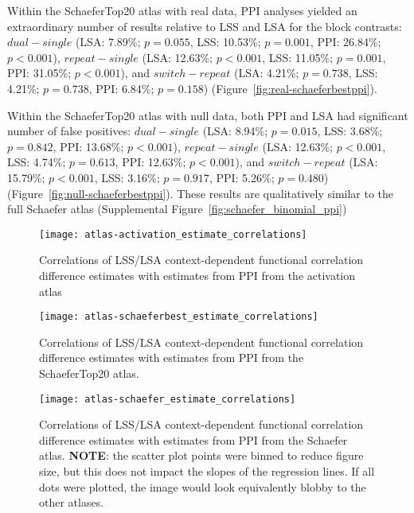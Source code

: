 \documentclass[phd,appendix,figures]{uithesis}
\begin{document}
Within the SchaeferTop20 atlas with real data, PPI analyses yielded an extraordinary number of results
relative to LSS and LSA for the block contrasts:
$dual - single$ (LSA: 7.89\%; $p = 0.055$, LSS: 10.53\%; $p = 0.001$, PPI: 26.84\%; $p < 0.001$),
$repeat - single$ (LSA: 12.63\%; $p < 0.001$, LSS: 11.05\%; $p = 0.001$, PPI: 31.05\%; $p < 0.001$), and
$switch - repeat$ (LSA: 4.21\%; $p = 0.738$, LSS: 4.21\%; $p = 0.738$, PPI: 6.84\%; $p = 0.158$) (Figure~\ref{fig:real-schaeferbestppi}).

Within the SchaeferTop20 atlas with null data, both PPI and LSA had significant number of false positives:
$dual - single$ (LSA: 8.94\%; $p = 0.015$, LSS: 3.68\%; $p = 0.842$, PPI: 13.68\%; $p < 0.001$),
$repeat - single$ (LSA: 12.63\%; $p < 0.001$, LSS: 4.74\%; $p = 0.613$, PPI: 12.63\%; $p < 0.001$), and
$switch - repeat$ (LSA: 15.79\%; $p < 0.001$, LSS: 3.16\%; $p = 0.917$, PPI: 5.26\%; $p = 0.480$) (Figure~\ref{fig:null-schaeferbestppi}).
These results are qualitatively similar to the full Schaefer atlas (Supplemental Figure~\ref{fig:schaefer_binomial_ppi})

\begin{figure}[H]
  \centering
  \texttt{[image: atlas-activation\_estimate\_correlations]}
  \caption[Correlation between LSA/LSS and PPI in the activation atlas]{
    Correlations of LSS/LSA context-dependent functional correlation difference estimates with
    estimates from PPI from the activation atlas
  }
  \label{fig:atlas-activation_correlations}
\end{figure}

\begin{figure}[H]
  \centering
  \texttt{[image: atlas-schaeferbest\_estimate\_correlations]}
  \caption[Correlation between LSA/LSS and PPI in the SchaeferTop20 atlas]{
    Correlations of LSS/LSA context-dependent functional correlation difference estimates with
    estimates from PPI from the SchaeferTop20 atlas.
  }
  \label{fig:atlas-schaeferbest_correlations}
\end{figure}

\begin{figure}[H]
  \centering
  \texttt{[image: atlas-schaefer\_estimate\_correlations]}
  \caption[Correlation between LSA/LSS and PPI in the Schaefer atlas]{
    Correlations of LSS/LSA context-dependent functional correlation difference estimates with
    estimates from PPI from the Schaefer atlas.
    \textbf{NOTE}: the scatter plot points were binned to reduce figure size, but
    this does not impact the slopes of the regression lines.
    If all dots were plotted, the image would look equivalently blobby
    to the other atlases.
  }
  \label{fig:atlas-schaefer_correlations}
\end{figure}
\end{document}
